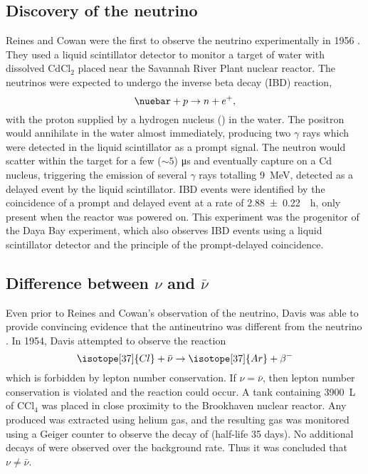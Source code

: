 \subsection{Discovery of the neutrino}
\label{subsec:discovery}

Reines and Cowan were the first to observe the neutrino experimentally in 1956
\cite{reines_cowan}.
They used a liquid scintillator detector to monitor a target of
water with dissolved $\text{CdCl}_2$
placed near the Savannah River Plant nuclear reactor.
The neutrinos were expected to undergo the inverse beta decay (IBD) reaction,
\begin{equation}\label{eq:ibd}
    \nuebar + p \to n + e^+,
\end{equation}
with the proton supplied by a hydrogen nucleus () in the water.
The positron would annihilate in the water almost immediately,
producing two $\gamma$ rays which were detected in the liquid scintillator
as a prompt signal.
The neutron would scatter within the target for a few ($\sim5$) \si{\us}
and eventually capture on a Cd nucleus,
triggering the emission of several $\gamma$ rays totalling \SI{9}{\MeV},
detected as a delayed event by the liquid scintillator.
IBD events were identified by the coincidence of a prompt and delayed event
at a rate of \SI[per-mode=reciprocal]{2.88\pm0.22}{\per\hour},
only present when the reactor was powered on.
This experiment was the progenitor of the Daya Bay experiment,
which also observes IBD events using a liquid scintillator detector
and the principle of the prompt-delayed coincidence.

\subsection{Difference between \texorpdfstring{$\nu$ and $\bar{\nu}$}{nu and nu-bar}}
\label{subsec:nu_vs_nubar}

Even prior to Reines and Cowan's observation of the neutrino,
Davis was able to provide convincing evidence that
the antineutrino was different from the neutrino \cite{davis_diff_nuebar}.
In 1954, Davis attempted to observe the reaction
\begin{equation}\label{eq:davis_nubar}
    \isotope[37]{Cl} + \bar{\nu} \to \isotope[37]{Ar} + \beta^-
\end{equation}
which is forbidden by lepton number conservation.
If $\nu=\bar{\nu}$, then lepton number conservation is violated
and the reaction could occur.
A tank containing \SI{3900}{\liter} of $\text{CCl}_4$
was placed in close proximity to the Brookhaven nuclear reactor.
Any  produced was extracted using helium gas,
and the resulting gas was monitored using a Geiger counter
to observe the decay of  (half-life 35 days).
No additional decays of  were observed over the background rate.
Thus it was concluded that $\nu\neq\bar{\nu}$.

